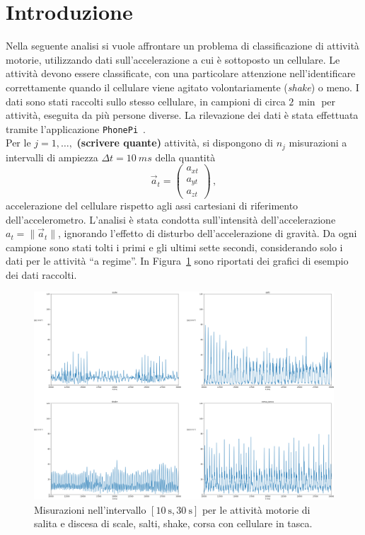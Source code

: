 \documentclass[./main.tex]{subfiles}
\begin{document}
\section{Introduzione}
Nella seguente analisi si vuole affrontare un problema di classificazione di attività motorie, utilizzando dati sull'accelerazione a cui è sottoposto un cellulare. Le attività devono essere classificate, con una particolare attenzione nell'identificare correttamente quando il cellulare viene agitato volontariamente ({\em shake}) o meno. I dati sono stati raccolti sullo stesso cellulare, in campioni di circa $\SI{2}{\min}$ per attività, eseguita da più persone diverse. La rilevazione dei dati è stata effettuata tramite l'applicazione \texttt{PhonePi}~\cite{kumar2019}.\\
Per le $j = 1, \ldots, $ \textbf{(scrivere quante)} attività, si dispongono di $n_j$ misurazioni a intervalli di ampiezza $\Delta t = \SI{10}{ms}$ della quantità
$$
\vec{a}_t = \begin{pmatrix}
a_{xt}\\
a_{yt}\\
a_{zt}
\end{pmatrix}\,,
$$
accelerazione del cellulare rispetto agli assi cartesiani di riferimento dell'accelerometro. L'analisi è stata condotta sull'intensità dell'accelerazione $a_t = \|\vec{a}_t\|$, ignorando l'effetto di disturbo dell'accelerazione di gravità. Da ogni campione sono stati tolti i primi e gli ultimi sette secondi, considerando solo i dati per le attività ``a regime''.
In Figura~\ref{fig:esempio} sono riportati dei grafici di esempio dei dati raccolti.
\begin{figure}[H]
	\label{fig:esempio}
	\centering
	\includegraphics[width=.8\textwidth, keepaspectratio]{../../figure/espl.png}
	\caption{Misurazioni nell'intervallo $ [\SI{10}{\second}, \SI{30}{\second}] $ per le attività motorie di salita e discesa di scale, salti, shake, corsa con cellulare in tasca.}
\end{figure}
\end{document}
